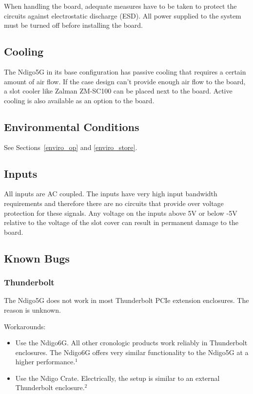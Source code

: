     When handling the board, adequate measures have to be taken to protect the circuits against electrostatic discharge (ESD). All power supplied to the system must be turned off before installing the board.

\subsection{Cooling}

    The Ndigo5G in its base configuration has passive cooling that requires a certain amount of air flow. If the case design can't provide enough air flow to the board, a slot cooler like Zalman ZM-SC100 can be placed next to the board. Active cooling is also available as an option to the board.

\subsection{Environmental Conditions}
    See Sections~\ref{enviro_op} and \ref{enviro_store}.

\subsection{Inputs}

    All inputs are AC coupled. The inputs have very high input bandwidth requirements and therefore there are no circuits that provide over voltage protection for these signals. Any voltage on the inputs above 5V or below -5V relative to the voltage of the slot cover can result in permanent damage to the board.

\subsection{Known Bugs}

\subsubsection{Thunderbolt}
The Ndigo5G does not work in most Thunderbolt PCIe extension enclosures. The reason is unknown.\par
Workarounds:
\begin{itemize}
    \item Use the Ndigo6G. All other cronologic products work reliably in Thunderbolt enclosures. The Ndigo6G offers very similar functionality to the Ndigo5G at a higher performance.$^1$
    \item Use the Ndigo Crate. Electrically, the setup is similar to an external Thunderbolt enclosure.$^2$ 
\end{itemize}

